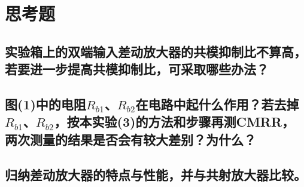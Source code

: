 \documentclass[a4paper]{article}
\begin{document}
\section{思考题}
\subsection{实验箱上的双端输入差动放大器的共模抑制比不算高，若要进一步提高共模抑制比，可采取哪些办法？}
\subsection{图(1)中的电阻$R_{b1}$、$R_{b2}$在电路中起什么作用？若去掉$R_{b1}$、$R_{b2}$，按本实验(3)的方法和步骤再测CMRR，两次测量的结果是否会有较大差别？为什么？}
\subsection{归纳差动放大器的特点与性能，并与共射放大器比较。}

\nocite{jiaocai}

\end{document}
